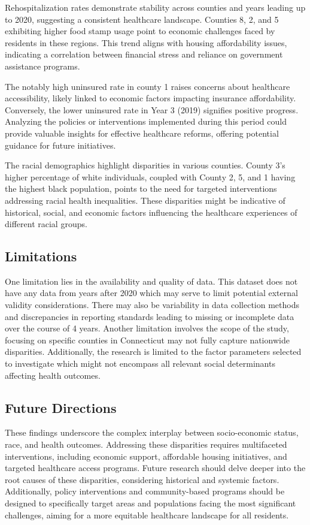 \documentclass[12pt]{article}
\begin{document}
Rehospitalization rates demonstrate stability across counties and years leading up to 2020, suggesting 
a consistent healthcare landscape. Counties 8, 2, and 5 exhibiting higher food stamp usage point to economic 
challenges faced by residents in these regions. This trend aligns with housing affordability issues, 
indicating a correlation between financial stress and reliance on government assistance programs.

The notably high uninsured rate in county 1 raises concerns about healthcare accessibility, likely 
linked to economic factors impacting insurance affordability. Conversely, the lower uninsured rate in 
Year 3 (2019) signifies positive progress. Analyzing the policies or interventions implemented during 
this period could provide valuable insights for effective healthcare reforms, offering potential guidance 
for future initiatives.

The racial demographics highlight disparities in various counties. County 3's higher percentage of white 
individuals, coupled with County 2, 5, and 1 having the highest black population, points to the need for
targeted interventions addressing racial health inequalities. These disparities might be indicative of 
historical, social, and economic factors influencing the healthcare experiences of different racial groups.

\subsection{Limitations}
One limitation lies in the availability and quality of data. This dataset does not have any 
data from years after 2020 which may serve to limit potential external validity considerations. 
There may also be variability in data collection methods and discrepancies in reporting standards 
leading to missing or incomplete data over the course of 4 years. Another limitation involves the scope 
of the study, focusing on specific counties in Connecticut may not fully capture nationwide disparities. 
Additionally, the research is limited to the factor parameters selected to investigate which  might not 
encompass all relevant social determinants affecting health outcomes.

\subsection{Future Directions}
These findings underscore the complex interplay between socio-economic status, race, and health outcomes. 
Addressing these disparities requires multifaceted interventions, including economic support, affordable 
housing initiatives, and targeted healthcare access programs. Future research should delve deeper into the 
root causes of these disparities, considering historical and systemic factors. Additionally, policy interventions 
and community-based programs should be designed to specifically target areas and populations facing the most 
significant challenges, aiming for a more equitable healthcare landscape for all residents.


\appendix



\end{document}
